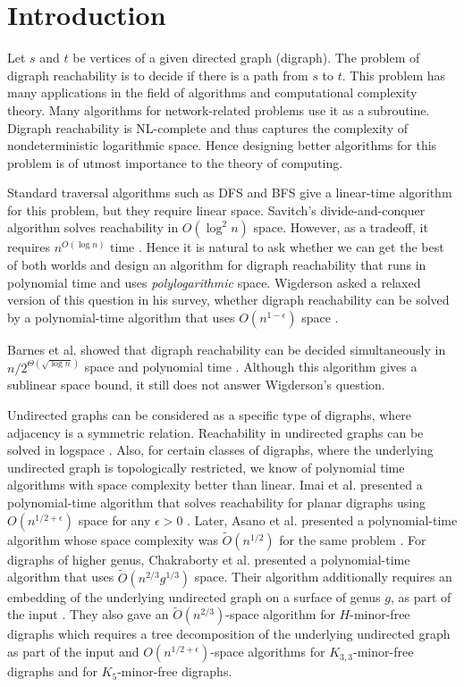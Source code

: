 \documentclass{toc}
\begin{document}
\section{Introduction}
%
%
%
%
%
%
%
%
%
%
%
Let $s$ and $t$ be vertices of a given 
%
directed graph (digraph). %
%
The problem of 
digraph %
reachability is to decide if there is a path from $s$ to $t$. This problem has %
%
many  %
applications in the field of algorithms and computational complexity theory. Many algorithms for network-related problems use it as a subroutine. 
%
Digraph reachability is \textsf{NL}-complete and thus
%
captures  %
the complexity of %
nondeterministic  %
logarithmic space. Hence designing better algorithms for this problem is of utmost importance
%
to the theory of computing.  %

Standard 
traversal algorithms such as DFS and BFS give a
%
linear-time   %
algorithm for this problem, but they require linear space. Savitch's 
divide-and-conquer 
%
algorithm %
solves  %
reachability in $O(\log^2 n)$ space. However, as a tradeoff, it requires $n^{O(\log n)}$ time \cite{Savitch}. Hence it is natural to ask whether we can get the best of both worlds and design an algorithm for 
digraph %
reachability that runs in polynomial time and uses \emph{polylogarithmic} space. Wigderson asked a relaxed version of this question in his survey, whether 
digraph %
reachability can be solved by a polynomial-time algorithm that uses $O(n^{1-\epsilon})$ space \cite{Wigderson}.

Barnes et al.  %
showed that 
%
digraph reachability %
can be decided simultaneously in $n/2^{\Theta(\sqrt{\log n})}$ space and polynomial time \cite{BBRS}. Although this algorithm gives a sublinear %
space bound,  %
it still does not %
answer Wigderson's question.

Undirected graphs can be considered as a specific type of digraphs,
where %
adjacency
%
%
%
%
is a symmetric relation.
Reachability in undirected %
graphs  %
can be solved in logspace \cite{Reingold}. %
%
%
Also, for certain classes of digraphs, where the underlying undirected graph is topologically restricted, we know of polynomial time algorithms with space complexity better than linear. %
%
%
%
Imai et al. presented  
a polynomial-time algorithm that %
solves  %
reachability for planar 
digraphs %
using $O(n^{1/2 + \epsilon})$ space for any $\epsilon >0$ \cite{Imai}. Later, Asano et al. presented a polynomial-time algorithm whose space complexity was $\tilde{O}(n^{1/2})$ for the same problem \cite{Asano}. For 
digraphs %
of higher genus, Chakraborty et al. presented a polynomial-time algorithm that uses $\tilde{O}(n^{2/3}g^{1/3})$ space. Their algorithm additionally requires an embedding of the 
underlying undirected %
graph on a surface of genus $g$, as part of the input \cite{ChakrabortyPavan}. They also gave an $\tilde{O}(n^{2/3})$-space %
algorithm for %
$H$-minor-free   %
digraphs %
which requires
a  %
tree decomposition of the 
underlying undirected %
graph as 
%
part of the %
 input and $O(n^{1/2 + \epsilon})$-space
%
%
%
%
%
%
%
%
%
%
algorithms for
%
%
$K_{3,3}$-minor-free digraphs and for $K_5$-minor-free digraphs. %
\end{document}
